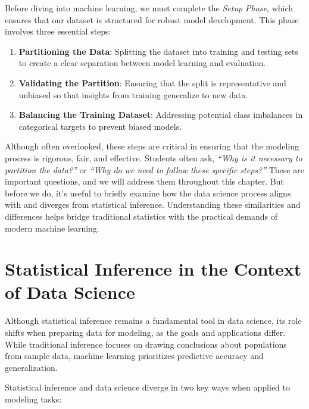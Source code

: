\documentclass[
  11pt,
]{book}
\providecommand{\tightlist}{%
  \setlength{\itemsep}{0pt}\setlength{\parskip}{0pt}}
\theoremstyle{definition}
\theoremstyle{definition}
\theoremstyle{definition}
\theoremstyle{definition}
\theoremstyle{remark}
\begin{document}
Before diving into machine learning, we must complete the \emph{Setup Phase}, which ensures that our dataset is structured for robust model development. This phase involves three essential steps:

\begin{enumerate}
\def\labelenumi{\arabic{enumi}.}
\tightlist
\item
  \textbf{Partitioning the Data}: Splitting the dataset into training and testing sets to create a clear separation between model learning and evaluation.\\
\item
  \textbf{Validating the Partition}: Ensuring that the split is representative and unbiased so that insights from training generalize to new data.\\
\item
  \textbf{Balancing the Training Dataset}: Addressing potential class imbalances in categorical targets to prevent biased models.
\end{enumerate}

Although often overlooked, these steps are critical in ensuring that the modeling process is rigorous, fair, and effective. Students often ask, \emph{``Why is it necessary to partition the data?''} or \emph{``Why do we need to follow these specific steps?''} These are important questions, and we will address them throughout this chapter. But before we do, it's useful to briefly examine how the data science process aligns with and diverges from statistical inference. Understanding these similarities and differences helps bridge traditional statistics with the practical demands of modern machine learning.

\section{Statistical Inference in the Context of Data Science}\label{statistical-inference-in-the-context-of-data-science}

Although statistical inference remains a fundamental tool in data science, its role shifts when preparing data for modeling, as the goals and applications differ. While traditional inference focuses on drawing conclusions about populations from sample data, machine learning prioritizes predictive accuracy and generalization.

Statistical inference and data science diverge in two key ways when applied to modeling tasks:
\end{document}
